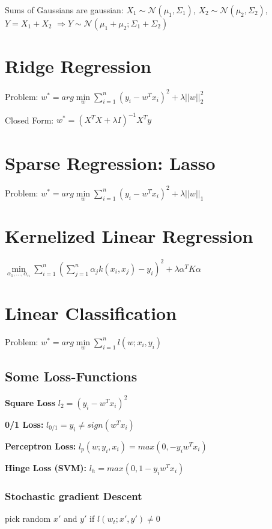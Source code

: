 \documentclass[11pt,twocolumn]{article}
\begin{document}
Sums of Gaussians are gaussian:
$X_1 \sim \mathcal{N}(\mu_1, \Sigma_1)$,
$X_2 \sim \mathcal{N}(\mu_2, \Sigma_2)$, 
$Y=X_1 + X_2$
$\Rightarrow Y \sim \mathcal{N}(\mu_1 + \mu_2; \Sigma_1+\Sigma_2)$





\section{Ridge Regression}

Problem: $ w^* =  arg \min \limits_w \sum \limits_{i=1}^n \left(y_i - w^Tx_i\right)^2 + \lambda ||w||_2^2$

Closed Form: $w^* = \left(X^T X + \lambda I \right)^{-1} X^T y$

\section{Sparse Regression: Lasso}

Problem: $ w^* =  arg \min \limits_w \sum \limits_{i=1}^n \left(y_i - w^Tx_i\right)^2 + \lambda ||w||_1$


\section{Kernelized Linear Regression}

$\min \limits_{\alpha_1,...,\alpha_n} \sum \limits_{i=1}^n\left( \sum \limits_{j=1}^n \alpha_j k(x_i,x_j) - y_i \right)^2 + \lambda \alpha^T K \alpha$

\section{Linear Classification}

Problem: $ w^* =  arg \min \limits_w \sum \limits_{i=1}^n l\left(w;x_i,y_i\right)$


\subsection{Some Loss-Functions}
\textbf{Square Loss} $l_2 = (y_i - w^T x_i)^2$

\textbf{0/1 Loss:} $ l_{0/1}  =  y_i \neq sign(w^Tx_i)$

\textbf{Perceptron Loss:} $l_p\left(w;y_i,x_i \right) =   max(0, -y_i w^T x_i)$

\textbf{Hinge Loss (SVM):} $l_h =   max(0, 1 -y_i w^T x_i)$

\subsubsection{Stochastic gradient Descent}
pick random $x'$ and $y'$
if $ l(w_t;x',y') \neq 0$
\end{document}
